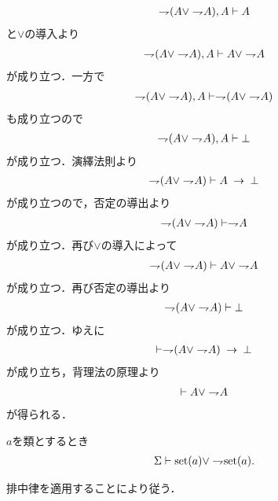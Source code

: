 	\begin{prf}
		\begin{align}
			\negation (A \vee \negation A), A \vdash A
		\end{align}
		と$\vee$の導入より
		\begin{align}
			\negation (A \vee \negation A), A \vdash A \vee \negation A
		\end{align}
		が成り立つ．一方で
		\begin{align}
			\negation (A \vee \negation A), A \vdash \negation (A \vee \negation A)
		\end{align}
		も成り立つので
		\begin{align}
			\negation (A \vee \negation A), A \vdash \bot
		\end{align}
		が成り立つ．演繹法則より
		\begin{align}
			\negation (A \vee \negation A) \vdash A \rarrow \bot
		\end{align}
		が成り立つので，否定の導出より
		\begin{align}
			\negation (A \vee \negation A) \vdash \negation A
		\end{align}
		が成り立つ．再び$\vee$の導入によって
		\begin{align}
			\negation (A \vee \negation A) \vdash A \vee \negation A
		\end{align}
		が成り立つ．再び否定の導出より
		\begin{align}
			\negation (A \vee \negation A) \vdash \bot
		\end{align}
		が成り立つ．ゆえに
		\begin{align}
			\vdash \negation (A \vee \negation A) \rarrow \bot
		\end{align}
		が成り立ち，背理法の原理より
		\begin{align}
			\vdash A \vee \negation A
		\end{align}
		が得られる．
		\QED
	\end{prf}
	
	\begin{screen}
		\begin{thm}[類は集合であるか真類であるかのいずれかに定まる]
			$a$を類とするとき
			\begin{align}
				\Sigma \vdash \set{a} \vee \negation \set{a}.
			\end{align}
		\end{thm}
	\end{screen}
	
	\begin{prf}
		排中律を適用することにより従う．
		\QED
	\end{prf}
	
